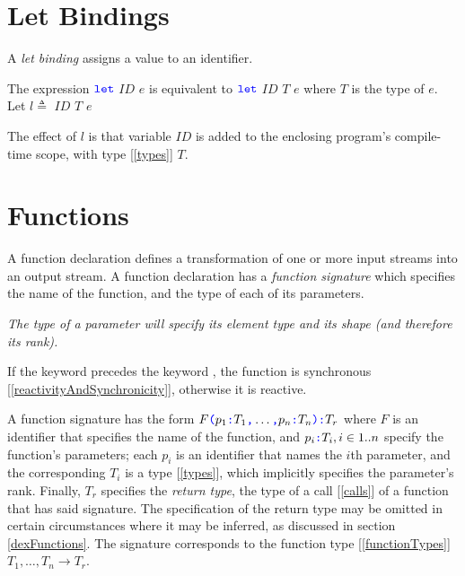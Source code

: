\documentclass{article}
\begin{document}
\section{Let Bindings}
\label{letBindings}

A {\em let binding} assigns a value to an identifier. 

\LetBinding{}

The expression $\texttt{\color{blue} let}{}$ $ID$ \BIND{} $e$ is equivalent to $\texttt{\color{blue} let}{}$ $ID$\COLON{} $T$ \BIND{} $e$  where $T$ is the type of $e$.
Let  $l \triangleq $ \LET{} $ID$\COLON{} $T$ \BIND{} $e$

The effect of $l$ is that variable $ID$ is added to the enclosing program's compile-time scope, with type [\ref{types}] $T$.


\section{Functions}
\label{functions}

\FunctionDeclaration

A function declaration defines a transformation of one or more input streams into an output stream. A function declaration has a
{\em function signature} which specifies the name of the function, and the type of each of its parameters.

{\em The type of a parameter will specify its element type and its shape (and therefore its rank). }

If the keyword \SYNC precedes the keyword \FUNC, the function is synchronous [\ref{reactivityAndSynchronicity}], otherwise it is reactive.

\FunctionSignature{}

\FunctionSignatureOptionalReturn{}

\ParameterList{}

\Parameter{}

A function signature has the form  $F\texttt{\color{blue} (}{}p_1\texttt{\color{blue} :} T_1\texttt{\color{blue} ,}{} \ldots\texttt{\color{blue} ,}{} p_n\texttt{\color{blue} :} T_n\texttt{\color{blue} )}{}\texttt{\color{blue} :} T_r$ where $F$ is an identifier that specifies the name of the function, and $p_i\texttt{\color{blue} :}{} T_i, i \in 1..n$ specify the function's parameters; each $p_i$ is an identifier that names the $i$th parameter, and the corresponding $T_i$ is a type [\ref{types}], which implicitly specifies the parameter's rank.  Finally, $T_r$ specifies the {\em return type}, the type of a call [\ref{calls}] of a function that has said signature. The specification of the return type may be omitted in certain circumstances where it may be inferred, as discussed in section \ref{dexFunctions}.
The signature corresponds to the function type [\ref{functionTypes}] $T_1, \ldots, T_n \to T_r$.
\end{document}
